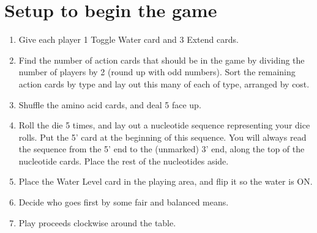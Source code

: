 \documentclass[a4paper,11pt,oneside]{memoir}
\begin{document}
\section*{Setup to begin the game}

\begin{enumerate}
    \item Give each player 1 Toggle Water card and 3 Extend cards.
    \item Find the number of action cards that should be in the game by dividing the number of players by 2 (round up with odd numbers).  Sort the remaining action cards by type and lay out this many of each of type, arranged by cost.
    \item Shuffle the amino acid cards, and deal 5 face up.  
    \item Roll the die 5 times, and lay out a nucleotide sequence representing your dice rolls.  Put the 5' card at the beginning of this sequence.  You will always read the sequence from the 5' end to the (unmarked) 3' end, along the top of the nucleotide cards.  Place the rest of the nucleotides aside. 
    \item Place the Water Level card in the playing area, and flip it so the water is ON.
    \item Decide who goes first by some fair and balanced means.
    \item Play proceeds clockwise around the table.\\
\end{enumerate}
\end{document}
